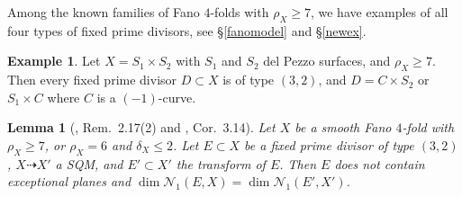 \documentclass[a4paper,12pt]{amsart}
\newtheorem{lemma}[thm]{Lemma}
\theoremstyle{definition}
\newtheorem{example}[thm]{Example}
\numberwithin{figure}{section}
\numberwithin{table}{section}
\newcommand{\N}{\mathcal{N}_1}
\begin{document}
    Among the known families of Fano $4$-folds with $\rho_X\geq 7$, we have examples of all four types of fixed prime divisors, see \S\ref{fanomodel} and \S\ref{newex}.
    \begin{example}
Let $X=S_1\times S_2$ with $S_1$ and $S_2$ del Pezzo surfaces, and $\rho_X\geq 7$. Then every fixed prime divisor $D\subset X$ is of type $(3,2)$, and $D=C\times S_2$ or $S_1\times C$ where $C$ is a $(-1)$-curve.
    \end{example}  
\begin{lemma}[\cite{blowup}, Rem.~2.17(2) and \cite{eff}, Cor.~3.14]\label{dim32}
  Let $X$ be a smooth Fano $4$-fold with $\rho_X\geq 7$,  or $\rho_X=6$ and $\delta_X\leq 2$. Let $E\subset X$ be a fixed prime divisor of type $(3,2)$, $X\dasharrow X'$ a SQM, and $E'\subset X'$ the transform of $E$. Then
   $E$ does not contain exceptional planes and
  $\dim\N(E,X)=\dim\N(E',X')$.
\end{lemma}
\end{document}

